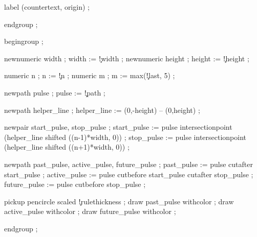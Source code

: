   label (countertext, origin) ;

  endgroup ;

\stopuseMPgraphic





  begingroup ;

  newnumeric width  ; width  := \visualcounterparameter\c!width ;
  newnumeric height ; height := \visualcounterparameter\c!height ;

  numeric n ; n := \visualcounterparameter\c!n ;
  numeric m ; m := max(\visualcounterparameter\c!last, 5) ;


  newpath pulse ;
  pulse := \visualcounterparameter\c!path ;

  newpath helper_line ;
  helper_line := (0,-height) -- (0,height) ;

  newpair start_pulse, stop_pulse ;
  start_pulse := pulse intersectionpoint (helper_line shifted ((n-1)*width, 0)) ;
  stop_pulse  := pulse intersectionpoint (helper_line shifted ((n+1)*width, 0)) ;

  
  newpath past_pulse, active_pulse, future_pulse ;
  past_pulse    := pulse cutafter start_pulse ;
  active_pulse  := pulse cutbefore start_pulse cutafter stop_pulse ;
  future_pulse  := pulse cutbefore stop_pulse ;

  pickup pencircle scaled \visualcounterparameter\c!rulethickness ;
  draw past_pulse   withcolor    ;
  draw active_pulse withcolor  ;
  draw future_pulse withcolor  ;

  endgroup ;
\stopuseMPgraphic

